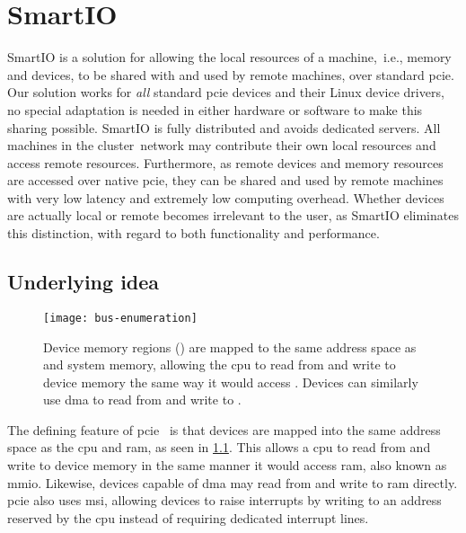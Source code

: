 \chapter{SmartIO}\label{chapter:smartio}
SmartIO is a solution for allowing the local resources of a machine,~i.e., memory and devices, to be shared with and used by remote machines, over standard \gls{pcie}.
%
Our solution works for \emph{all} standard \gls{pcie} devices and their Linux device drivers, no special adaptation is needed in either hardware or software to make this sharing possible.
%
SmartIO is fully distributed and avoids dedicated servers.
%
All machines in the cluster~network may contribute their own local resources and access remote resources.
%
Furthermore, as remote devices and memory resources are accessed over native \gls{pcie}, they can be shared and used by remote machines with very low latency and extremely low computing overhead.
%
Whether devices are actually local or remote becomes irrelevant to the user, as SmartIO eliminates this distinction, with regard to both functionality and performance.
%
\newline\newline%


\section{Underlying idea}\label{sec:idea}
\begin{figure}
    \centering
    \texttt{[image: bus-enumeration]}
    \caption[Devices are mapped to the same address space as the  and system memory]
    {Device memory regions () are mapped to the same address space as  and system memory, allowing
    the \gls{cpu} to read from and write to device memory the same way it would access . Devices can similarly use \gls{dma} to read from and write to .}
    \label{fig:bus-enumeration}
\end{figure}
The defining feature of \gls{pcie}~\cite{spec:PCIe} is that devices are mapped into the same address space as the \gls{cpu} and \gls{ram}, as seen in \cref{fig:bus-enumeration}.
%
This allows a \gls{cpu} to read from and write to device memory in the same manner it would access \gls{ram}, also known as \gls{mmio}.
%
Likewise, devices capable of \gls{dma} may read from and write to \gls{ram} directly.
%
\Gls{pcie} also uses \gls{msi}, allowing devices to raise interrupts by writing to an address reserved by the \gls{cpu} instead of requiring dedicated interrupt lines.



